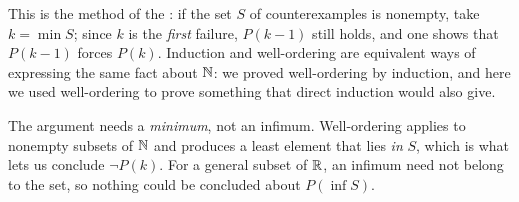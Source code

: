 \begin{remark}
  This is the method of the : if the set $S$ of
  counterexamples is nonempty, take $k = \min S$; since $k$ is the
  \emph{first} failure, $P(k - 1)$ still holds, and one shows that $P(k - 1)$
  forces $P(k)$. Induction and well-ordering are equivalent ways of
  expressing the same fact about $\mathbb{N}$: we proved well-ordering by induction,
  and here we used well-ordering to prove something that direct induction
  would also give.
\end{remark}

\begin{warning}
  The argument needs a \emph{minimum}, not an infimum. Well-ordering applies
  to nonempty subsets of $\mathbb{N}$ and produces a least element that lies
  \emph{in} $S$, which is what lets us conclude $\neg P(k)$. For a general
  subset of $\mathbb{R}$, an infimum need not belong to the set, so nothing could be
  concluded about $P(\inf S)$.
\end{warning}
